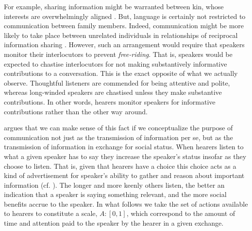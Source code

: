 \documentclass[linguex]{sp}
\theoremstyle{definition} \newtheorem{definition}{Definition}
\begin{document}
For example,  sharing information might be warranted between kin, whose interests are overwhelmingly  aligned \citep{hamilton1963,hamilton1964}. But, language is certainly not restricted to communication between family members. Indeed, communication might be more likely to take place between unrelated individuals in relationships of reciprocal information sharing \citep{trivers1971}. However, such an arrangement would require that speakers monitor their interlocutors to prevent \emph{free-riding}. That is, speakers would be expected to chastise interlocutors for not making substantively informative contributions to a conversation. This is the exact opposite of what we actually observe. Thoughtful listeners are commended for being attentive and polite, whereas long-winded speakers are chastised unless they make substantive contributions. In other words, hearers monitor speakers for informative contributions rather than the other way around.


\cite{dessalles2007} argues that we can make sense of this fact if we conceptualize the purpose of communication not just as the transmission of information per se, but as the transmission of information in exchange for social status.  When hearers listen to what a given speaker has to say they increase the speaker's status insofar as they choose to listen. That is, given that hearers have a choice this choice acts as a kind of advertisement for speaker's ability to gather and reason about important information (cf. \citealt{gintis2001,dessalles2014}).  The longer and more keenly others listen, the better an indication that a speaker is saying something relevant, and the more social benefits accrue to the speaker. In what follows we take the set of actions available to hearers to constitute a scale, $A : [0,1]$, which correspond to the amount of time and attention paid to the speaker by the hearer in a given exchange.
\end{document}
